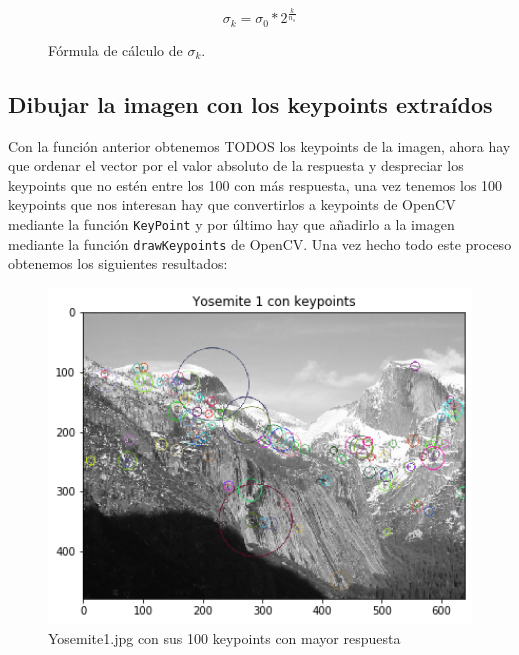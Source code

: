 \documentclass[12pt,spanish]{article}
\begin{document}
\begin{figure}[H]
	\centering
	\[\sigma_k = \sigma_0 * 2^\frac{k}{n_s} \]
	\caption{Fórmula de  cálculo de $\sigma_k$.}
	\label{calculo_sigma_k}
\end{figure}

\subsection{Dibujar la imagen con los keypoints extraídos}
Con la función anterior obtenemos TODOS los keypoints de la imagen, ahora hay que ordenar el vector por el valor absoluto de la respuesta y despreciar los keypoints que no estén entre los 100 con más respuesta, una vez tenemos los 100 keypoints que nos interesan hay que convertirlos a keypoints de OpenCV mediante la función \texttt{KeyPoint} y por último hay que añadirlo a la imagen mediante la función \texttt{drawKeypoints} de OpenCV. Una vez hecho todo este proceso obtenemos los siguientes resultados:

\begin{figure}[H]
	\centering
	\includegraphics[width=12cm]{./imagenes_memoria/kpyose1.png}
	\caption{Yosemite1.jpg con sus 100 keypoints con mayor respuesta}
	\label{kp_yose1}
\end{figure}
\end{document}
